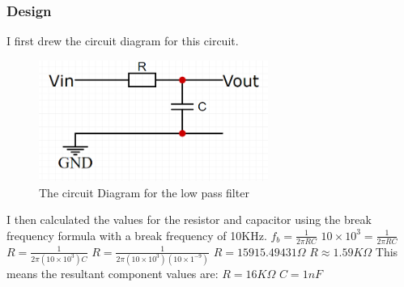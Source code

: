 \subsubsection{Design}
I first drew the circuit diagram for this circuit.
\begin{figure}[H]
    \centering
    \includegraphics[width=7.5cm]{images/lpfCircuitDiagram.PNG}
    \caption{The circuit Diagram for the low pass filter}
    \label{fig:lpfCircuitDiagram}
\end{figure}
\noindent I then calculated the values for the resistor and capacitor using the break frequency formula with a break frequency of 10KHz.\newline
$\displaystyle f_b = \frac{1}{2 \pi RC}$ \vspace{3mm} \newline
$\displaystyle 10\times 10 ^3 = \frac{1}{2 \pi RC}$ \vspace{3mm} \newline
$\displaystyle R = \frac{1}{2\pi(10\times 10 ^3)C}$ \vspace{3mm} \newline
$\displaystyle R = \frac{1}{2\pi(10\times 10 ^3)(10\times 1 ^{-9})}$ \vspace{3mm} \newline
$R = 15915.49431\Omega$ \vspace{3mm} \newline
$R\approx 1.59K\Omega$ \vspace{3mm} \newline
This means the resultant component values are: \newline
\indent $R = 16K\Omega$ \newline
\indent $C = 1nF$
